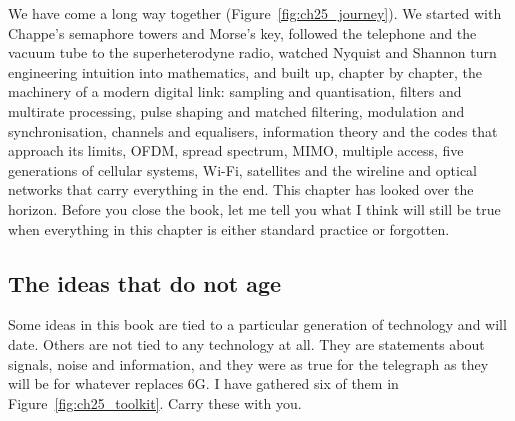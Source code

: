 We have come a long way together (Figure~\ref{fig:ch25_journey}). We started with Chappe's semaphore towers and Morse's key, followed
the telephone and the vacuum tube to the superheterodyne radio, watched Nyquist and Shannon turn
engineering intuition into mathematics, and built up, chapter by chapter, the machinery of a modern
digital link: sampling and quantisation, filters and multirate processing, pulse shaping and matched
filtering, modulation and synchronisation, channels and equalisers, information theory and the codes
that approach its limits, OFDM, spread spectrum, MIMO, multiple access, five generations of cellular
systems, Wi-Fi, satellites and the wireline and optical networks that carry everything in the end. This
chapter has looked over the horizon. Before you close the book, let me tell you what I think will
still be true when everything in this chapter is either standard practice or forgotten.

\subsection{The ideas that do not age}

Some ideas in this book are tied to a particular generation of technology and will date. Others are
not tied to any technology at all. They are statements about signals, noise and information, and
they were as true for the telegraph as they will be for whatever replaces 6G. I have gathered six of
them in Figure~\ref{fig:ch25_toolkit}. Carry these with you.


